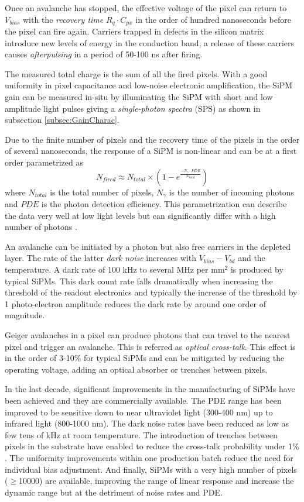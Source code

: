 Once an avalanche has stopped, the effective voltage of the pixel can return to $V_{bias}$ with the \textit{recovery time} $R_q \cdot C_{px}$ in the order of hundred nanoseconds before the pixel can fire again. Carriers trapped in defects in the silicon matrix introduce new levels of energy in the conduction band, a release of these carriers causes \textit{afterpulsing} in a period of 50-100 ns after firing.

The measured total charge is the sum of all the fired pixels. With a good uniformity in pixel capacitance and low-noise electronic amplification, the SiPM gain can be measured in-situ by illuminating the SiPM with short and low amplitude light pulses giving a \textit{single-photon spectra} (SPS) as shown in subsection \ref{subsec:GainCharac}.

Due to the finite number of pixels and the recovery time of the pixels in the order of several nanoseconds, the response of a SiPM is non-linear and can be at a first order parametrized as
\begin{equation}
  N_{fired} \approx N_{total} \times (1 - e^{\frac{- N_{\gamma} \cdot PDE}{N_{total}}})
\end{equation}
where $N_{total}$ is the total number of pixels, $N_{\gamma}$ is the number of incoming photons and $PDE$ is the photon detection efficiency. This parametrization can describe the data very well at low light levels but can significantly differ with a high number of photons \cite{Kotera:2015rha}.

An avalanche can be initiated by a photon but also free carriers in the depleted layer. The rate of the latter \textit{dark noise} increases with $V_{bias} - V_{bd}$ and the temperature. A dark rate of 100 kHz to several MHz per mm$^2$ is produced by typical SiPMs. This dark count rate falls dramatically when increasing the threshold of the readout electronics and typically the increase of the threshold by 1 photo-electron amplitude reduces the dark rate by around one order of magnitude.

Geiger avalanches in a pixel can produce photons that can travel to the nearest pixel and trigger an avalanche. This is referred as \textit{optical cross-talk}. This effect is in the order of 3-10\% for typical SiPMs and can be mitigated by reducing the operating voltage, adding an optical absorber or trenches between pixels.

In the last decade, significant improvements in the manufacturing of SiPMs have been achieved and they are commercially available. The PDE range has been improved to be sensitive down to near ultraviolet light (300-400 nm) up to infrared light (800-1000 nm). The dark noise rates have been reduced as low as few tens of kHz at room temperature. The introduction of trenches between pixels in the substrate have enabled to reduce the cross-talk probability under 1\% \cite{Liu:2015cpe}. The uniformity improvements within one production batch reduce the need for individual bias adjustment. And finally, SiPMs with a very high number of pixels ($\geq$10000) are available, improving the range of linear response and increase the dynamic range but at the detriment of noise rates and PDE.

